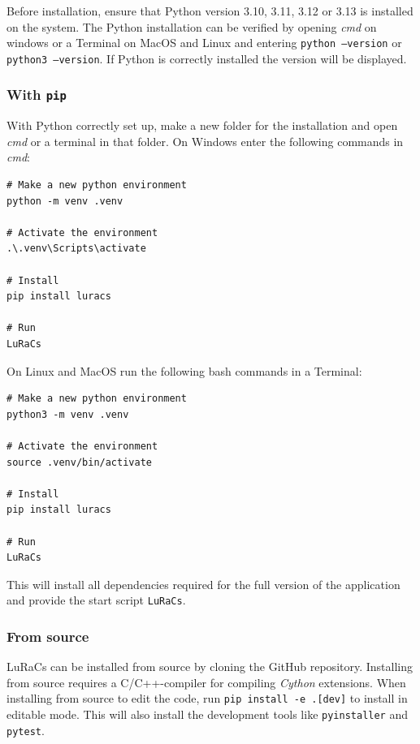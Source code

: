 Before installation, ensure that Python version 3.10, 3.11, 3.12 or 3.13 is installed on the system. The Python installation can be verified by opening \textit{cmd} on windows or a Terminal on MacOS and Linux and entering \texttt{python --version} or \texttt{python3 --version}. If Python is correctly installed the version will be displayed.

\subsubsection{With \texttt{pip}}
With Python correctly set up, make a new folder for the installation and open \textit{cmd} or a terminal in that folder. On Windows enter the following commands in \textit{cmd}:
\begin{verbatim}
# Make a new python environment
python -m venv .venv

# Activate the environment
.\.venv\Scripts\activate

# Install
pip install luracs

# Run
LuRaCs
\end{verbatim}

On Linux and MacOS run the following bash commands in a Terminal:
\begin{verbatim}
# Make a new python environment
python3 -m venv .venv

# Activate the environment
source .venv/bin/activate

# Install
pip install luracs

# Run
LuRaCs
\end{verbatim}
This will install all dependencies required for the full version of the application and provide the start script \texttt{LuRaCs}.

\subsubsection{From source}
LuRaCs can be installed from source by cloning the GitHub repository. Installing from source requires a C/C++-compiler for compiling \textit{Cython} extensions. When installing from source to edit the code, run \texttt{pip install -e .[dev]} to install in editable mode. This will also install the development tools like \texttt{pyinstaller} and \texttt{pytest}.

